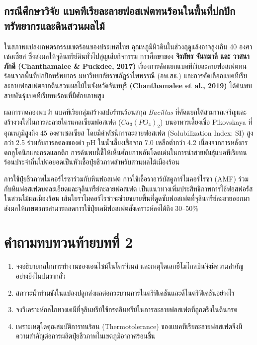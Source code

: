 \subsection{กรณีศึกษาวิจัย แบคทีเรียละลายฟอสเฟตทนร้อนในพื้นที่ปกปักทรัพยากรและดินสวนผลไม้}

ในสภาพแปลงเกษตรกรรมเขตร้อนของประเทศไทย อุณหภูมิผิวดินในช่วงฤดูแล้งอาจสูงเกิน 40 องศาเซลเซียส ซึ่งส่งผลให้จุลินทรีย์ดินทั่วไปสูญเสียกิจกรรม การศึกษาของ \textbf{จิรภัทร จันทมาลี และ วาสนา ภักดี (Chanthamalee \& Puckdee, 2017)} เรื่องการคัดแยกแบคทีเรียละลายฟอสเฟตทนร้อนจากพื้นที่ปกปักทรัพยากร มหาวิทยาลัยราชภัฏรำไพพรรณี (อพ.สธ.) และการคัดเลือกแบคทีเรียละลายฟอสเฟตจากดินสวนผลไม้ในจังหวัดจันทบุรี \textbf{(Chanthamalee et al., 2019)} ได้ค้นพบสายพันธุ์แบคทีเรียทนร้อนที่มีศักยภาพสูง

ผลการทดลองพบว่า แบคทีเรียกลุ่มสร้างสปอร์ทนร้อนสกุล \textit{Bacillus} ที่คัดแยกได้สามารถเจริญและสร้างวงใสในการละลายไตรแคลเซียมฟอสเฟต ($Ca_3(PO_4)_2$) บนอาหารเลี้ยงเชื้อ Pikovskaya ที่อุณหภูมิสูงถึง 45 องศาเซลเซียส โดยมีค่าดัชนีการละลายฟอสเฟต (Solubilization Index: SI) สูงกว่า 2.5 ร่วมกับการลดลงของค่า pH ในน้ำเลี้ยงเชื้อจาก 7.0 เหลือต่ำกว่า 4.2 เนื่องจากการหลั่งกรดกลูโคนิกและกรดแลกติก การค้นพบนี้ชี้ให้เห็นศักยภาพอันโดดเด่นในการนำสายพันธุ์แบคทีเรียทนร้อนประจำถิ่นไปต่อยอดเป็นหัวเชื้อปุ๋ยชีวภาพสำหรับสวนผลไม้เมืองร้อน

\begin{agribox}{การใช้ปุ๋ยชีวภาพไมคอร์ไรซาร่วมกับหินฟอสเฟต}
การใช้เชื้อราอาร์บัสคูลาร์ไมคอร์ไรซา (AMF) ร่วมกับหินฟอสเฟตบดละเอียดและจุลินทรีย์ละลายฟอสเฟต เป็นแนวทางเพิ่มประสิทธิภาพการใช้ฟอสฟอรัสในสวนไม้ผลเมืองร้อน เส้นใยราไมคอร์ไรซาจะช่วยขยายพื้นที่ดูดซับฟอสเฟตที่จุลินทรีย์ละลายออกมา ส่งผลให้เกษตรกรสามารถลดการใช้ปุ๋ยเคมีฟอสเฟตสังเคราะห์ลงได้ถึง 30--50\%
\end{agribox}

\section*{คำถามทบทวนท้ายบทที่ 2}
\begin{enumerate}
    \item จงอธิบายกลไกการทำงานของเอนไซม์ไนโตรจีเนส และเหตุใดเลกฮีโมโกลบินจึงมีความสำคัญอย่างยิ่งในปมรากถั่ว
    \item สภาวะน้ำท่วมขังในแปลงปลูกส่งผลต่อกระบวนการไนตริฟิเคชันและดีไนตริฟิเคชันอย่างไร
    \item จงวิเคราะห์กลไกทางเคมีที่จุลินทรีย์ใช้กรดอินทรีย์ในการละลายฟอสเฟตที่ถูกตรึงในดินกรด
    \item เพราะเหตุใดคุณสมบัติการทนร้อน (Thermotolerance) ของแบคทีเรียละลายฟอสเฟตจึงมีความสำคัญต่อการผลิตปุ๋ยชีวภาพในเขตภูมิอากาศร้อนชื้น
\end{enumerate}

\clearpage